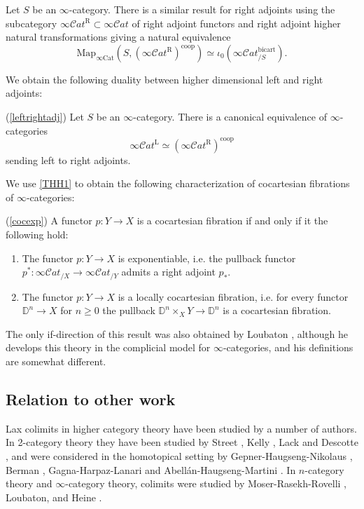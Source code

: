 \documentclass[10pt,oneside]{article}
\numberwithin{equation}{section} %
\numberwithin{figure}{section} %
\theoremstyle{plain}
\theoremstyle{definition}
\newcommand{\bD}{{\mathbb D}}
\newcommand{\Cat}{\mathrm{Cat}}
\newcommand{\bicart}{{\mathrm{bicart}}}
\newcommand{\coop}{\mathrm{coop}}
\newcommand{\Map}{{\mathrm{Map}}}
\newcommand{\scat}{\mathcal{C}\mathit{at}}
\begin{document}
Let $S$ be an $\infty$-category. There is a similar result for right adjoints using the subcategory $\infty\scat^{\mathrm{R}}\subset \infty\scat$ of right adjoint functors and right adjoint higher natural transformations giving a natural equivalence 
$$ \Map_{\infty\Cat}(S,(\infty\scat^{\mathrm{R}})^\coop) \simeq \iota_0(\infty\scat^{\bicart}_{/S}).$$

We obtain the following duality between higher dimensional left and right adjoints:

\begin{corollary}(\cref{leftrightadj})
Let $S$ be an $\infty$-category.
There is a canonical equivalence of $\infty$-categories
$$ \infty\scat^{\mathrm{L}} \simeq (\infty\scat^{\mathrm{R}})^\coop$$
sending left to right adjoints.

\end{corollary}


We use \cref{THH1} to obtain the following characterization of cocartesian fibrations of $\infty$-categories:

\begin{theorem}(\cref{cocexp})
A functor $p: Y \to X$ is a cocartesian fibration if and only if it the following hold:

\begin{enumerate}[\normalfont(1)]\setlength{\itemsep}{-2pt}
\item The functor $p: Y \to X$ is exponentiable, i.e. the pullback functor $p^*:\infty\scat_{/X}\to\infty\scat_{/Y}$ admits a right adjoint $p_*$.

\item The functor $p: Y \to X$ is a locally cocartesian fibration, i.e.
for every functor $\bD^n \to X$ for $n \geq 0$ the pullback $ \bD^n \times_{X} Y \to \bD^n$ is a cocartesian fibration.
    
\end{enumerate}
\end{theorem}


The only if-direction of this result was also obtained by Loubaton \cite{loubaton2024categorical}, although he develops this theory in the complicial model for $\infty$-categories, and his definitions are somewhat different.

\subsection{Relation to other work}
Lax colimits in higher category theory have been studied by a number of authors. In 2-category theory they have been studied by Street \cite{street1976limits}, Kelly \cite{kelly1989elementary}, Lack \cite{lack20092} and Descotte \cite{descotte2018sigma}, and 
were considered in the homotopical setting by Gepner-Haugseng-Nikolaus \cite{articles}, Berman \cite{berman2024lax}, Gagna-Harpaz-Lanari \cite{gagna2020fibrations} and Abell\'an-Haugseng-Martini \cite{abellan2026free}.
In $n$-category theory and $\infty$-category theory, colimits were studied by Moser-Rasekh-Rovelli 
\cite{moser2023limits}, Loubaton, \cite{loubaton2024categorical} and Heine \cite{heine2024higher}.
\end{document}
